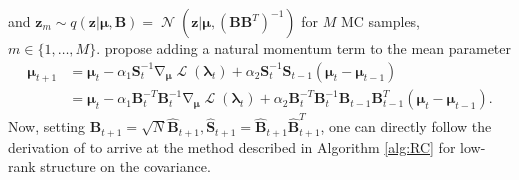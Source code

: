 \documentclass[a4paper, 11pt, oneside]{scrartcl}
\theoremstyle{break}
\DeclareMathOperator{\Normal}{\mathcal{N}}
\DeclareMathOperator{\grad}{\nabla}
\DeclareMathOperator{\ELBO}{\mathcal{L}}
\newcommand{\matr}[1]{\boldsymbol{#1}}
\numberwithin{equation}{section}
\begin{document}
				and $\matr{z}_m \sim q(\matr{z} | \matr{\mu}, \matr{B}) = \Normal(\matr{z} | \matr{\mu}, (\matr{B} \matr{B}^T)^{-1})$ for $M$ MC samples, $m \in \{1, \dots, M\}$.
				\parencite{KNT+18, LSK20} propose adding a natural momentum term to the mean parameter
				\begin{align*}
					\matr{\mu}_{t+1} &= \matr{\mu}_t - \alpha_1 \matr{S}_t^{-1} \grad_{\matr{\mu}} \ELBO (\matr{\lambda}_t) + \alpha_2 \matr{S}_t^{-1} \matr{S}_{t-1} (\matr{\mu}_t - \matr{\mu}_{t-1}) \\
					&= \matr{\mu}_t - \alpha_1 \matr{B}_t^{-T} \matr{B}_t^{-1} \grad_{\matr{\mu}} \ELBO (\matr{\lambda}_t) + \alpha_2 \matr{B}_t^{-T} \matr{B}_t^{-1} \matr{B}_{t-1} \matr{B}_{t-1}^T (\matr{\mu}_t - \matr{\mu}_{t-1}).
				\end{align*}
				Now, setting $\matr{B}_{t+1} = \sqrt{N} \matr{\hat{B}}_{t+1}, \matr{\hat{S}}_{t+1} = \matr{\hat{B}}_{t+1} \matr{\hat{B}}_{t+1}^T$, one can directly follow the derivation of \parencite[Sec. E.3]{LSK20} to arrive at the method described in Algorithm \ref{alg:RC} for low-rank structure on the covariance.
\end{document}
